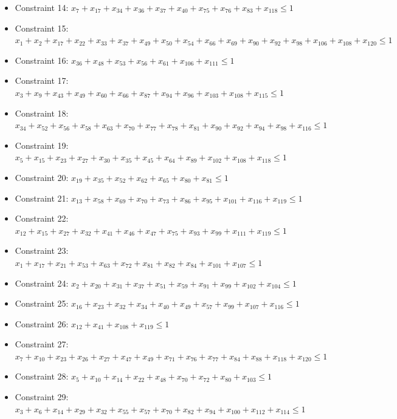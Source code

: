 \documentclass[11pt]{article}
\begin{document}
\begin{itemize}
\item Constraint 14: $x_{7} + x_{17} + x_{34} + x_{36} + x_{37} + x_{40} + x_{75} + x_{76} + x_{83} + x_{118} \le 1$
\item Constraint 15: $x_{1} + x_{2} + x_{17} + x_{22} + x_{33} + x_{37} + x_{49} + x_{50} + x_{54} + x_{66} + x_{69} + x_{90} + x_{92} + x_{98} + x_{106} + x_{108} + x_{120} \le 1$
\item Constraint 16: $x_{36} + x_{48} + x_{53} + x_{56} + x_{61} + x_{106} + x_{111} \le 1$
\item Constraint 17: $x_{3} + x_{9} + x_{43} + x_{49} + x_{60} + x_{66} + x_{87} + x_{94} + x_{96} + x_{103} + x_{108} + x_{115} \le 1$
\item Constraint 18: $x_{34} + x_{52} + x_{56} + x_{58} + x_{63} + x_{70} + x_{77} + x_{78} + x_{81} + x_{90} + x_{92} + x_{94} + x_{98} + x_{116} \le 1$
\item Constraint 19: $x_{5} + x_{15} + x_{23} + x_{27} + x_{30} + x_{35} + x_{45} + x_{64} + x_{89} + x_{102} + x_{108} + x_{118} \le 1$
\item Constraint 20: $x_{19} + x_{35} + x_{52} + x_{62} + x_{65} + x_{80} + x_{81} \le 1$
\item Constraint 21: $x_{13} + x_{58} + x_{69} + x_{70} + x_{73} + x_{86} + x_{95} + x_{101} + x_{116} + x_{119} \le 1$
\item Constraint 22: $x_{12} + x_{15} + x_{27} + x_{32} + x_{41} + x_{46} + x_{47} + x_{75} + x_{93} + x_{99} + x_{111} + x_{119} \le 1$
\item Constraint 23: $x_{1} + x_{17} + x_{21} + x_{53} + x_{63} + x_{72} + x_{81} + x_{82} + x_{84} + x_{101} + x_{107} \le 1$
\item Constraint 24: $x_{2} + x_{20} + x_{31} + x_{37} + x_{51} + x_{59} + x_{91} + x_{99} + x_{102} + x_{104} \le 1$
\item Constraint 25: $x_{16} + x_{23} + x_{32} + x_{34} + x_{40} + x_{49} + x_{57} + x_{99} + x_{107} + x_{116} \le 1$
\item Constraint 26: $x_{12} + x_{41} + x_{108} + x_{119} \le 1$
\item Constraint 27: $x_{7} + x_{10} + x_{23} + x_{26} + x_{27} + x_{47} + x_{49} + x_{71} + x_{76} + x_{77} + x_{84} + x_{88} + x_{118} + x_{120} \le 1$
\item Constraint 28: $x_{5} + x_{10} + x_{14} + x_{22} + x_{48} + x_{70} + x_{72} + x_{80} + x_{103} \le 1$
\item Constraint 29: $x_{3} + x_{6} + x_{14} + x_{29} + x_{32} + x_{55} + x_{57} + x_{70} + x_{82} + x_{94} + x_{100} + x_{112} + x_{114} \le 1$

\end{itemize}
\end{document}
